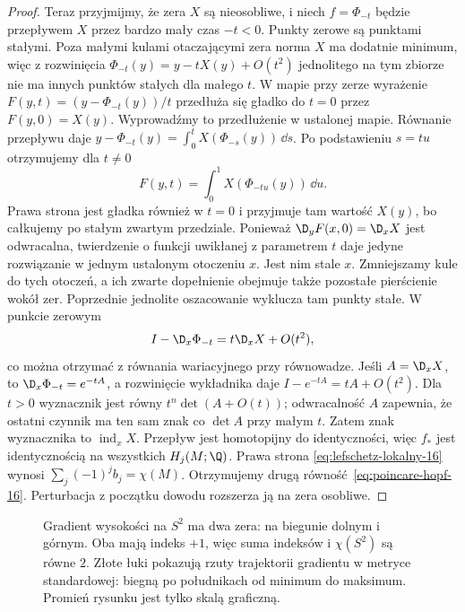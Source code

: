\begin{proof}
Teraz przyjmijmy, że
zera $X$ są nieosobliwe,
i niech $f=\Phi_{-t}$
będzie przepływem
$X$ przez bardzo
mały czas $-t<0$.
Punkty zerowe są
punktami stałymi.
Poza małymi kulami
otaczającymi zera
norma $X$ ma
dodatnie minimum,
więc z rozwinięcia
$\Phi_{-t}(y)=y-tX(y)+O(t^2)$
jednolitego na tym
zbiorze nie ma
innych punktów
stałych dla małego $t$.
W mapie przy zerze wyrażenie
$F(y,t)=(y-\Phi_{-t}(y))/t$ przedłuża się gładko
do $t=0$ przez $F(y,0)=X(y)$.
Wyprowadźmy to przedłużenie w ustalonej mapie.
Równanie przepływu daje
$y-\Phi_{-t}(y)=\int_0^t X(\Phi_{-s}(y))\,\dd s$.
Po podstawieniu $s=tu$ otrzymujemy dla $t\ne0$
\[
 F(y,t)=\int_0^1 X(\Phi_{-tu}(y))\,\dd u.
\]
Prawa strona jest gładka również w $t=0$ i przyjmuje
tam wartość $X(y)$, bo całkujemy po stałym zwartym przedziale.
Ponieważ
$\D_yF(x,0)=\D_xX$ jest odwracalna, twierdzenie
o funkcji uwikłanej z parametrem $t$ daje jedyne
rozwiązanie w jednym ustalonym otoczeniu $x$.
Jest nim stale $x$. Zmniejszamy kule do tych
otoczeń, a ich zwarte dopełnienie obejmuje także
pozostałe pierścienie wokół zer. Poprzednie
jednolite oszacowanie wyklucza tam punkty stałe.
W punkcie zerowym
\[
 I-\D_x\Phi_{-t}
   =t\D_xX+O(t^2),
\]
co można otrzymać z równania wariacyjnego przy równowadze.
Jeśli $A=\D_xX$, to $\D_x\Phi_{-t}=e^{-tA}$,
a rozwinięcie wykładnika daje $I-e^{-tA}=tA+O(t^2)$.
Dla $t>0$ wyznacznik jest równy $t^n\det(A+O(t))$;
odwracalność $A$ zapewnia, że ostatni czynnik
ma ten sam znak co $\det A$ przy małym $t$.
Zatem znak wyznacznika
to $\operatorname{ind}_xX$.
Przepływ jest
homotopijny do
identyczności,
więc $f_*$ jest
identycznością
na wszystkich
$H_j(M;\Q)$.
Prawa strona
\eqref{eq:lefschetz-lokalny-16}
wynosi
$\sum_j(-1)^j b_j=\chi(M)$.
Otrzymujemy drugą
równość~\eqref{eq:poincare-hopf-16}.
Perturbacja z początku
dowodu rozszerza ją
na zera osobliwe.
\end{proof}

\begin{figure}[H]
\centering
{}
\caption{Gradient wysokości na $S^2$
ma dwa zera: na biegunie dolnym
i górnym. Oba mają indeks $+1$,
więc suma indeksów i $\chi(S^2)$ są równe $2$.
Złote łuki pokazują rzuty trajektorii gradientu
w metryce standardowej: biegną po południkach od minimum
do maksimum. Promień rysunku jest tylko skalą graficzną.}
\label{fig:poincare-hopf-16}
\end{figure}


